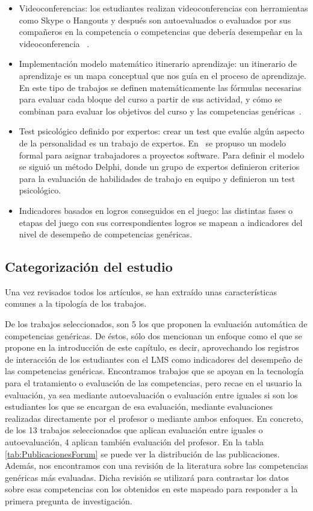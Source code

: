 \begin{itemize}
\item Videoconferencias: los estudiantes realizan videoconferencias con herramientas como Skype o Hangouts y después son autoevaluados o evaluados por sus compañeros en la competencia o competencias que debería desempeñar en la videoconferencia~ \cite{masip2013self,ward2011developing}.
\item Implementación modelo matemático itinerario aprendizaje: un itinerario de aprendizaje es un mapa conceptual que nos guía en el proceso de aprendizaje. En este tipo de trabajos se definen matemáticamente las fórmulas necesarias para evaluar cada bloque del curso a partir de sus actividad, y cómo se combinan para evaluar los objetivos del curso y las competencias genéricas~\cite{yang2014fine}.
\item Test psicológico definido por expertos: crear un test que evalúe algún aspecto de la personalidad es un trabajo de expertos. En~\cite{andre2011formal} se propuso un modelo formal para asignar trabajadores a proyectos software. Para definir el modelo se siguió un método Delphi, donde un grupo de expertos definieron criterios para la evaluación de habilidades de trabajo en equipo y definieron un test psicológico.
\item Indicadores basados en logros conseguidos en el juego: las distintas fases o etapas del juego con sus correspondientes logros se mapean a indicadores del nivel de desempeño de competencias genéricas.
\end{itemize}

\subsection{Categorización del estudio}

Una vez revisados todos los artículos, se han extraído unas características comunes a la tipología de los trabajos. 

De los trabajos seleccionados, son 5 los que proponen la evaluación automática de competencias genéricas. De éstos, sólo dos mencionan un enfoque como el que se propone en la introducción de este capítulo, es decir, aprovechando los registros de interacción de los estudiantes con el LMS como indicadores del desempeño de las competencias genéricas. Encontramos trabajos que se apoyan en la tecnología para el tratamiento o evaluación de las competencias, pero recae en el usuario la evaluación, ya sea mediante autoevaluación o evaluación entre iguales si son los estudiantes los que se encargan de esa evaluación, mediante evaluaciones realizadas directamente por el profesor o mediante ambos enfoques. En concreto, de los 13 trabajos seleccionados que aplican evaluación entre iguales o autoevaluación, 4 aplican también evaluación del profesor. En la tabla \ref{tab:PublicacionesForum} se puede ver la distribución de las publicaciones. Además, nos encontramos con una revisión de la literatura sobre las competencias genéricas más evaluadas. Dicha revisión se utilizará para contrastar los datos sobre esas competencias con los obtenidos en este mapeado para responder a la primera pregunta de investigación. %

